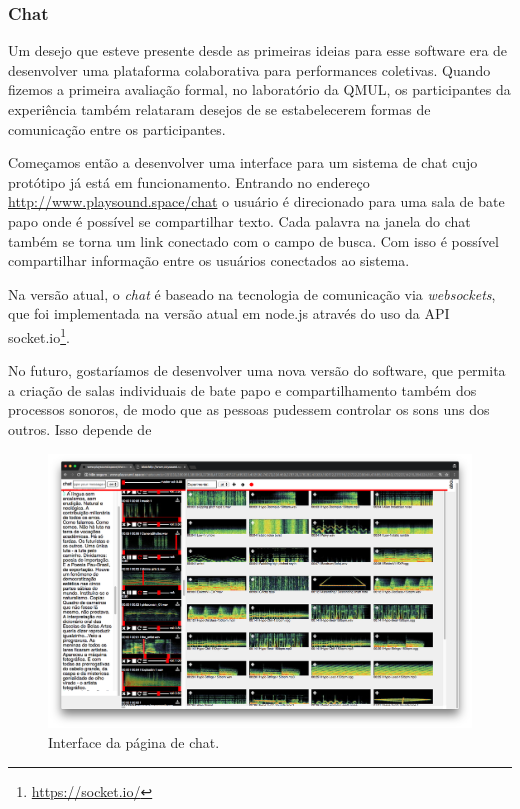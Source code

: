 \subsubsection{Chat}
Um desejo que esteve presente desde as primeiras ideias para esse software era de desenvolver uma plataforma colaborativa para performances coletivas. Quando fizemos a primeira avaliação formal, no laboratório da QMUL, os participantes da experiência também relataram desejos de se estabelecerem formas de comunicação entre os participantes.

Começamos então a desenvolver uma interface para um sistema de chat cujo protótipo já está em funcionamento. Entrando no endereço \url{http://www.playsound.space/chat} o usuário é direcionado para uma sala de bate papo onde é possível se compartilhar texto. Cada palavra na janela do chat também se torna um link conectado com o campo de busca. Com isso é possível compartilhar informação entre os usuários conectados ao sistema.

Na versão atual, o \emph{chat} é baseado na tecnologia de comunicação via \emph{websockets}, que foi implementada na versão atual em node.js através do uso da API socket.io\footnote{\url{https://socket.io/}}. 

No futuro, gostaríamos de desenvolver uma nova versão do software, que permita a criação de salas individuais de bate papo e compartilhamento também dos processos sonoros, de modo que as pessoas pudessem controlar os sons uns dos outros. Isso depende de 

\begin{figure}
\includegraphics[width=1\textwidth]{pictures/cap4/playsound-chat}
\caption{Interface da página de chat.}
\label{fig:pschat}
\end{figure}



